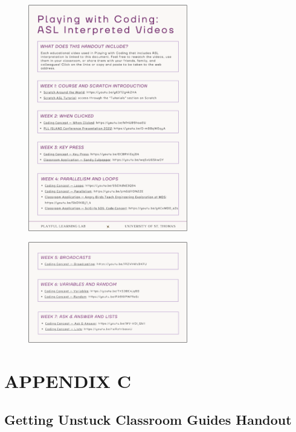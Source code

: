 \documentclass[11.5pt]{sig-alternate} %
\begin{document}
\begin{large}
\begin{figure}[hb]
    \centering
    \includegraphics[width=0.62\textwidth]{images/appendix1.png}
    \label{Appendix 1a}
\end{figure}

\begin{figure}[hb]
    \centering
    \includegraphics[width=0.62\textwidth]{images/appendix1_b.png}
    \label{Appendix 1b}
\end{figure}

\clearpage

\section*{APPENDIX C}
\subsection*{Getting Unstuck Classroom Guides Handout}



\end{large}
\end{document}
